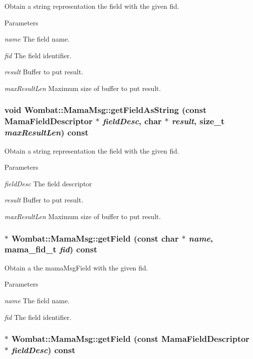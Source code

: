 Obtain a string representation the field with the given fid. 
\begin{DoxyParams}{Parameters}
\item[{\em name}]The field name. \item[{\em fid}]The field identifier. \item[{\em result}]Buffer to put result. \item[{\em maxResultLen}]Maximum size of buffer to put result. \end{DoxyParams}
\hypertarget{classWombat_1_1MamaMsg_a05c09e3881c04eb299f6f1ea2c1c23e8}{
\subsubsection[{getFieldAsString}]{\setlength{\rightskip}{0pt plus 5cm}void Wombat::MamaMsg::getFieldAsString (const {\bf MamaFieldDescriptor} $\ast$ {\em fieldDesc}, \/  char $\ast$ {\em result}, \/  size\_\-t {\em maxResultLen}) const}}
\label{classWombat_1_1MamaMsg_a05c09e3881c04eb299f6f1ea2c1c23e8}


Obtain a string representation the field with the given fid. 
\begin{DoxyParams}{Parameters}
\item[{\em fieldDesc}]The field descriptor \item[{\em result}]Buffer to put result. \item[{\em maxResultLen}]Maximum size of buffer to put result. \end{DoxyParams}
\hypertarget{classWombat_1_1MamaMsg_af28564db85ad4c1bd5fafffa0516891a}{
\subsubsection[{getField}]{$\ast$ Wombat::MamaMsg::getField (const char $\ast$ {\em name}, \/  mama\_\-fid\_\-t {\em fid}) const}}
\label{classWombat_1_1MamaMsg_af28564db85ad4c1bd5fafffa0516891a}


Obtain a the mamaMsgField with the given fid. 
\begin{DoxyParams}{Parameters}
\item[{\em name}]The field name. \item[{\em fid}]The field identifier. \end{DoxyParams}
\hypertarget{classWombat_1_1MamaMsg_a5b9641bc62c364a653d57e442198769e}{
\subsubsection[{getField}]{$\ast$ Wombat::MamaMsg::getField (const {\bf MamaFieldDescriptor} $\ast$ {\em fieldDesc}) const}}
\label{classWombat_1_1MamaMsg_a5b9641bc62c364a653d57e442198769e}


